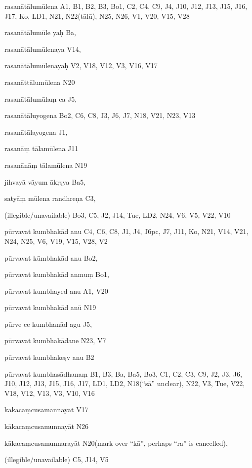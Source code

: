 \begin{ekdosis}
\begin{marma}[hp01_055]
\begin{marma}[hp02_009]
\begin{marma}[hp02_011]
\begin{marma}[hp02_56*1]
\begin{description}
        \end{description}
\end{marma}


\begin{marma}[hp02_57a]
\item[rasanātālumūlena] A1, B1, B2, B3, Bo1, C2, C4, C9, J4, J10, J12, J13, J15, J16, J17, Ko, LD1, N21, N22(tālū), N25, N26, V1, V20, V15, V28
\item[rasanātālumūle yaḥ] Ba,
\item[rasanātālumūlenaya] V14,
\item[rasanātālumūlenayaḥ] V2, V18, V12, V3, V16, V17
\item[rasanāttālumūlena] N20
\item[rasanātālumūlaṃ ca] J5, 
\item[rasanātāluyogena] Bo2, C6, C8, J3, J6, J7, N18, V21, N23, V13
\item[rasanātālayogena] J1,
\item[rasanāṃ tālamūlena] J11
\item[rasanānāṃ tālamūlena] N19
\item[jihvayā vāyum ākṛṣya] Ba5,
\item[satyāṃ mūlena randhreṇa] C3,
\item[]
\item[(illegible/unavailable)] Bo3, C5, J2, J14, Tue, LD2, N24, V6, V5, V22, V10
 \begin{description}

        \end{description}
\end{marma}

\begin{marma}[hp02_58b]
\item[pūrvavat kumbhakād anu] C4, C6, C8, J1, J4, J6pc, J7, J11, Ko, N21, V14, V21,  N24, N25, V6, V19, V15, V28, V2
\item[pūrvavat kūmbhakād anu] Bo2,
\item[pūrvavat kumbhakād anmuṃ] Bo1,
\item[pūrvavat kumbhayed anu] A1, V20
\item[pūrvavat kumbhakād anū] N19
\item[pūrve ce kumbhanād agu] J5,
\item[pūrvavat kumbhakādane] N23, V7
\item[pūrvavat kumbhakeṣv anu] B2
\item[pūrvavat kumbhasādhanaṃ] B1, B3, Ba, Ba5, Bo3, C1, C2, C3, C9, J2, J3, J6, J10, J12, J13, J15, J16, J17, LD1, LD2, N18(“sā” unclear), N22, V3, Tue, V22, V18, V12, V13, V3, V10, V16
\item[kākacaṃcusamannayāt] V17
\item[kākacaṃcusamunnayāt] N26
\item[kākacaṃcusamunnarayāt] N20(mark over “kā”, perhaps “ra” is cancelled), 
\item[(illegible/unavailable)] C5, J14, V5
 \begin{description}


\end{description}
\end{marma}
\end{marma}
\end{marma}
\end{marma}
\end{ekdosis}
